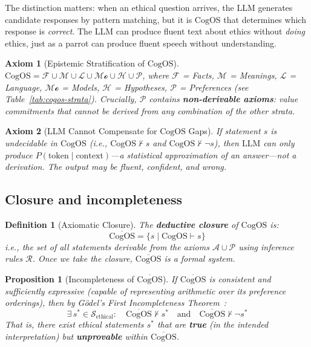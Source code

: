 \documentclass[11pt]{article}
\newtheorem{proposition}{Proposition}
\newtheorem{definition}{Definition}
\newtheorem{axiom}{Axiom}
\newcommand{\CogOS}{\text{CogOS}}
\begin{document}
\noindent The distinction matters: when an ethical question arrives, the LLM
generates candidate responses by pattern matching, but it is $\CogOS$ that
determines which response is \textit{correct}. The LLM can produce fluent text
about ethics without \textit{doing} ethics, just as a parrot can produce fluent
speech without understanding.

\begin{axiom}[Epistemic Stratification of $\CogOS$]
\label{ax:strat}
$\CogOS = \mathcal{F} \cup \mathcal{M} \cup \mathcal{L} \cup \mathcal{Mo}
\cup \mathcal{H} \cup \mathcal{P}$, where $\mathcal{F}$ = Facts,
$\mathcal{M}$ = Meanings, $\mathcal{L}$ = Language, $\mathcal{Mo}$ = Models,
$\mathcal{H}$ = Hypotheses, $\mathcal{P}$ = Preferences
(see Table~\ref{tab:cogos-strata}). Crucially, $\mathcal{P}$ contains
\textbf{non-derivable axioms}: value commitments that cannot be derived from
any combination of the other strata.
\end{axiom}

\begin{axiom}[LLM Cannot Compensate for $\CogOS$ Gaps]
\label{ax:llm-limit}
If statement $s$ is undecidable in $\CogOS$ (i.e.,
$\CogOS \nvdash s$ and $\CogOS \nvdash \neg s$), then $\text{LLM}$ can only
produce $P(\text{token} \mid \text{context})$---a \textit{statistical
approximation} of an answer---not a derivation. The output may be fluent,
confident, and wrong.
\end{axiom}


\subsection{Closure and incompleteness}

\begin{definition}[Axiomatic Closure]
\label{def:closure}
The \textbf{deductive closure} of $\CogOS$ is:
\begin{equation}
\overline{\CogOS} = \{s \mid \CogOS \vdash s\}
\end{equation}
i.e., the set of all statements derivable from the axioms
$\mathcal{A} \cup \mathcal{P}$ using inference rules $\mathcal{R}$.
Once we take the closure, $\overline{\CogOS}$ is a formal system.
\end{definition}

\begin{proposition}[Incompleteness of $\overline{\CogOS}$]
\label{prop:incompleteness}
If $\overline{\CogOS}$ is consistent and sufficiently expressive (capable of
representing arithmetic over its preference orderings), then by G\"{o}del's
First Incompleteness Theorem~\citep{godel1931}:
\begin{equation}
\exists\, s^* \in \mathcal{S}_{\text{ethical}}: \quad
\overline{\CogOS} \nvdash s^* \quad \text{and} \quad
\overline{\CogOS} \nvdash \neg s^*
\end{equation}
That is, there exist ethical statements $s^*$ that are \textbf{true} (in the
intended interpretation) but \textbf{unprovable} within $\overline{\CogOS}$.
\end{proposition}
\end{document}
